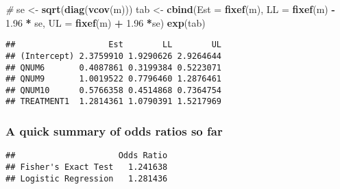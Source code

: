 \documentclass[]{article}
\newenvironment{Shaded}{\begin{snugshade}}{\end{snugshade}}
\newcommand{\KeywordTok}[1]{\textcolor[rgb]{0.13,0.29,0.53}{\textbf{#1}}}
\newcommand{\DataTypeTok}[1]{\textcolor[rgb]{0.13,0.29,0.53}{#1}}
\newcommand{\DecValTok}[1]{\textcolor[rgb]{0.00,0.00,0.81}{#1}}
\newcommand{\FloatTok}[1]{\textcolor[rgb]{0.00,0.00,0.81}{#1}}
\newcommand{\StringTok}[1]{\textcolor[rgb]{0.31,0.60,0.02}{#1}}
\newcommand{\CommentTok}[1]{\textcolor[rgb]{0.56,0.35,0.01}{\textit{#1}}}
\newcommand{\OtherTok}[1]{\textcolor[rgb]{0.56,0.35,0.01}{#1}}
\newcommand{\OperatorTok}[1]{\textcolor[rgb]{0.81,0.36,0.00}{\textbf{#1}}}
\newcommand{\NormalTok}[1]{#1}
\begin{document}
\begin{Shaded}
\begin{Highlighting}[]
\CommentTok{#}
\NormalTok{se <-}\StringTok{ }\KeywordTok{sqrt}\NormalTok{(}\KeywordTok{diag}\NormalTok{(}\KeywordTok{vcov}\NormalTok{(m)))}
\NormalTok{tab <-}\StringTok{ }\KeywordTok{cbind}\NormalTok{(}\DataTypeTok{Est =} \KeywordTok{fixef}\NormalTok{(m), }\DataTypeTok{LL =} \KeywordTok{fixef}\NormalTok{(m) }\OperatorTok{-}\StringTok{ }\FloatTok{1.96} \OperatorTok{*}\StringTok{ }\NormalTok{se, }\DataTypeTok{UL =} \KeywordTok{fixef}\NormalTok{(m) }\OperatorTok{+}\StringTok{ }\FloatTok{1.96} \OperatorTok{*}\NormalTok{se)}
\KeywordTok{exp}\NormalTok{(tab)}
\end{Highlighting}
\end{Shaded}

\begin{verbatim}
##                   Est        LL        UL
## (Intercept) 2.3759910 1.9290626 2.9264644
## QNUM6       0.4087861 0.3199384 0.5223071
## QNUM9       1.0019522 0.7796460 1.2876461
## QNUM10      0.5766358 0.4514868 0.7364754
## TREATMENT1  1.2814361 1.0790391 1.5217969
\end{verbatim}

\subsubsection{A quick summary of odds ratios so
far}\label{a-quick-summary-of-odds-ratios-so-far}

\begin{Shaded}
\end{Shaded}

\begin{verbatim}
##                     Odds Ratio
## Fisher's Exact Test   1.241638
## Logistic Regression   1.281436
\end{verbatim}
\end{document}
